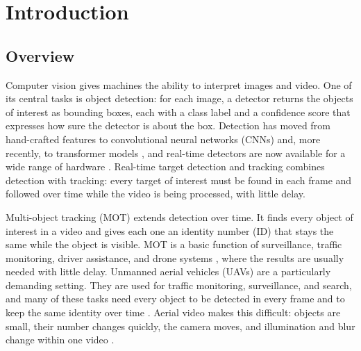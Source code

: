 \chapter{Introduction}\label{ch:intro}

\section{Overview}\label{sec:intro-overview}
Computer vision gives machines the ability to interpret images and video. One of its central tasks is object detection: for each image, a detector returns the objects of interest as bounding boxes, each with a class label and a confidence score that expresses how sure the detector is about the box. Detection has moved from hand-crafted features to convolutional neural networks (CNNs) and, more recently, to transformer models \cite{li2025motreview,ren2017fasterrcnn,redmon2016yolo,carion2020detr}, and real-time detectors are now available for a wide range of hardware \cite{ismail2026realtime}. Real-time target detection and tracking combines detection with tracking: every target of interest must be found in each frame and followed over time while the video is being processed, with little delay.

Multi-object tracking (MOT) extends detection over time. It finds every object of interest in a video and gives each one an identity number (ID) that stays the same while the object is visible. MOT is a basic function of surveillance, traffic monitoring, driver assistance, and drone systems \cite{zhu2022visdrone,wu2022uavsurvey,geiger2012kitti}, where the results are usually needed with little delay. Unmanned aerial vehicles (UAVs) are a particularly demanding setting. They are used for traffic monitoring, surveillance, and search, and many of these tasks need every object to be detected in every frame and to keep the same identity over time \cite{wu2022uavsurvey,zhu2022visdrone}. Aerial video makes this difficult: objects are small, their number changes quickly, the camera moves, and illumination and blur change within one video \cite{zhu2022visdrone,du2018uavdt,cheng2023smallobject}.

